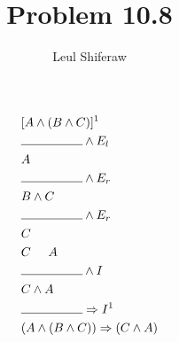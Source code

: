 \documentclass{article}
\title{Problem 10.8}
\author{Leul Shiferaw}
\begin{document}
\maketitle
\newpage
{}

\begin{align*}
	&[A\wedge (B\wedge C)]^1\\
	&\line(1, 0){50}
	\wedge E_l\\
	&A \\
	&\line(1, 0){50}\wedge E_r\\
	&B\wedge C\\
	&\line(1, 0){50}\wedge E_r\\
	&C\\
	&C\hspace{0.5cm} A \\
	&\line(1, 0){50}\wedge I\\
	&C\wedge A\\
	&\line(1, 0){50}\Rightarrow I^1\\
	&(A\wedge (B\wedge C)) \Rightarrow (C \wedge A)
\end{align*}
\end{document}
